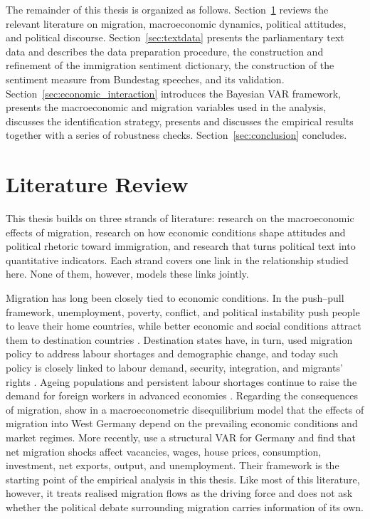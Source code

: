 \documentclass[12pt]{scrartcl}
\numberwithin{equation}{section}				%
\begin{document}
    The remainder of this thesis is organized as follows. Section~\ref{sec:literature} 
    reviews the relevant literature on migration, macroeconomic dynamics, political 
    attitudes, and political discourse. Section~\ref{sec:textdata} presents the 
    parliamentary text data and describes the data preparation procedure, the 
    construction and refinement of the immigration sentiment dictionary, the 
    construction of the sentiment measure from Bundestag speeches, and its 
    validation. Section~\ref{sec:economic_interaction} introduces the Bayesian VAR 
    framework, presents the macroeconomic and migration variables used in the 
    analysis, discusses the identification strategy, presents and discusses the 
    empirical results together with a series of robustness checks. 
    Section~\ref{sec:conclusion} concludes.
    
    \section{Literature Review}
    \label{sec:literature}
    
    This thesis builds on three strands of literature: research on the macroeconomic effects of migration, research on how economic conditions shape attitudes and political rhetoric toward immigration, and research that turns political text into quantitative indicators. Each strand covers one link in the relationship studied here. None of them, however, models these links jointly.
    
    Migration has long been closely tied to economic conditions. In the push--pull framework, unemployment, poverty, conflict, and political instability push people to leave their home countries, while better economic and social conditions attract them to destination countries \parencite{lee1966theory,hatton2005global}. Destination states have, in turn, used migration policy to address labour shortages and demographic change, and today such policy is closely linked to labour demand, security, integration, and migrants' rights \parencite{hollifield2004emerging}. Ageing populations and persistent labour shortages continue to raise the demand for foreign workers in advanced economies \parencite{oecd2024labour,oecd2024migration}. Regarding the consequences of migration, \textcite{franz1994macroeconometric} show in a macroeconometric disequilibrium model that the effects of migration into West Germany depend on the prevailing economic conditions and market regimes. More recently, \textcite{maffei2021does} use a structural VAR for Germany and find that net migration shocks affect vacancies, wages, house prices, consumption, investment, net exports, output, and unemployment. Their framework is the starting point of the empirical analysis in this thesis. Like most of this literature, however, it treats realised migration flows as the driving force and does not ask whether the political debate surrounding migration carries information of its own.
    
\end{document}

